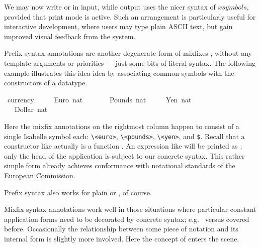 \begin{isabellebody}
\begin{isamarkuptext}
  \medskip We may now write  or  in
  input, while output uses the nicer syntax of $xsymbols$, provided
  that print mode is active.  Such an arrangement is particularly
  useful for interactive development, where users may type plain ASCII
  text, but gain improved visual feedback from the system.%
\end{isamarkuptext}%
\isamarkuptrue%
%
\isamarkuptrue%
%
\begin{isamarkuptext}%
Prefix syntax annotations are another
  degenerate form of mixfixes \cite{isabelle-ref}, without any
  template arguments or priorities --- just some bits of literal
  syntax.  The following example illustrates this idea idea by
  associating common symbols with the constructors of a datatype.%
\end{isamarkuptext}%
\isamarkuptrue%
\ currency\ {\isacharequal}\isanewline
\ \ \ \ Euro\ nat\ \ \ \ {\isacharparenleft}{\isachardoublequote}{\isasymeuro}{\isachardoublequote}{\isacharparenright}\isanewline
\ \ {\isacharbar}\ Pounds\ nat\ \ {\isacharparenleft}{\isachardoublequote}{\isasympounds}{\isachardoublequote}{\isacharparenright}\isanewline
\ \ {\isacharbar}\ Yen\ nat\ \ \ \ \ {\isacharparenleft}{\isachardoublequote}{\isasymyen}{\isachardoublequote}{\isacharparenright}\isanewline
\ \ {\isacharbar}\ Dollar\ nat\ \ {\isacharparenleft}{\isachardoublequote}{\isachardollar}{\isachardoublequote}{\isacharparenright}\isamarkupfalse%
%
\begin{isamarkuptext}%
\noindent Here the mixfix annotations on the rightmost column happen
  to consist of a single Isabelle symbol each: \verb,\,\verb,<euro>,,
  \verb,\,\verb,<pounds>,, \verb,\,\verb,<yen>,, and \verb,$,.  Recall
  that a constructor like  actually is a function .  An expression like  will be
  printed as ; only the head of the application is
  subject to our concrete syntax.  This rather simple form already
  achieves conformance with notational standards of the European
  Commission.

  Prefix syntax also works for plain  or
  , of course.%
\end{isamarkuptext}%
\isamarkuptrue%
%
\isamarkuptrue%
%
\begin{isamarkuptext}%
Mixfix syntax annotations work well in those situations where
  particular constant application forms need to be decorated by
  concrete syntax; e.g.\  versus 
  covered before.  Occasionally the relationship between some piece of
  notation and its internal form is slightly more involved.  Here the
  concept of  enters the scene.


\end{isamarkuptext}
\end{isabellebody}
